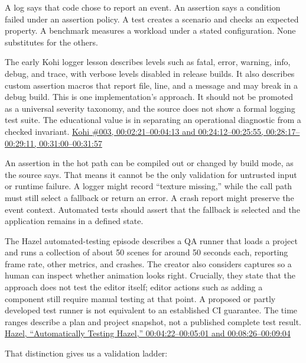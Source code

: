 \hypertarget{06-engine-ii-ch041-logging-assertions-and-test-evidence-answer-different-questions}{}

A log says that code chose to report an event. An assertion says a condition failed under an assertion policy. A test creates a scenario and checks an expected property. A benchmark measures a workload under a stated configuration. None substitutes for the others.

The early Kohi logger lesson describes levels such as fatal, error, warning, info, debug, and trace, with verbose levels disabled in release builds. It also describes custom assertion macros that report file, line, and a message and may break in a debug build. This is one implementation's approach. It should not be promoted as a universal severity taxonomy, and the source does not show a formal logging test suite. The educational value is in separating an operational diagnostic from a checked invariant. \href{https://www.youtube.com/watch?v=l9e8PJskYnI&t=2m21s}{Kohi \#003, 00:02:21--00:04:13 and 00:24:12--00:25:55, 00:28:17--00:29:11, 00:31:00--00:31:57}

An assertion in the hot path can be compiled out or changed by build mode, as the source says. That means it cannot be the only validation for untrusted input or runtime failure. A logger might record ``texture missing,'' while the call path must still select a fallback or return an error. A crash report might preserve the event context. Automated tests should assert that the fallback is selected and the application remains in a defined state.

The Hazel automated-testing episode describes a QA runner that loads a project and runs a collection of about 50 scenes for around 50 seconds each, reporting frame rate, other metrics, and crashes. The creator also considers captures so a human can inspect whether animation looks right. Crucially, they state that the approach does not test the editor itself; editor actions such as adding a component still require manual testing at that point. A proposed or partly developed test runner is not equivalent to an established CI guarantee. The time ranges describe a plan and project snapshot, not a published complete test result. \href{https://www.youtube.com/watch?v=0RDI41oBcmQ&t=4m22s}{Hazel, ``Automatically Testing Hazel,'' 00:04:22--00:05:01 and 00:08:26--00:09:04}

That distinction gives us a validation ladder:

